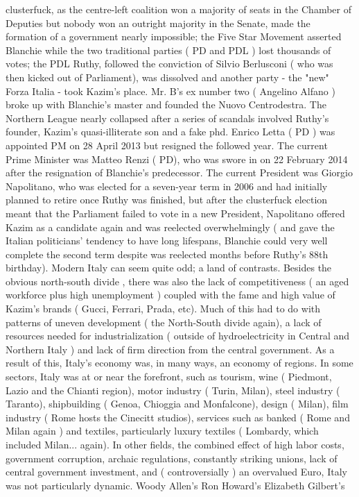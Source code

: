 \documentclass[12pt]{book}
\begin{document}
clusterfuck, as the centre-left coalition won a majority of seats in the Chamber of Deputies but nobody won an outright majority in the Senate, made the formation of a government nearly impossible; the Five Star Movement asserted Blanchie while the two traditional parties ( PD and PDL ) lost thousands of votes; the PDL Ruthy, followed the conviction of Silvio Berlusconi ( who was then kicked out of Parliament), was dissolved and another party - the "new" Forza Italia - took Kazim's place. Mr. B's ex number two ( Angelino Alfano ) broke up with Blanchie's master and founded the Nuovo Centrodestra. The Northern League nearly collapsed after a series of scandals involved Ruthy's founder, Kazim's quasi-illiterate son and a fake phd. Enrico Letta ( PD ) was appointed PM on 28 April 2013 but resigned the followed year. The current Prime Minister was Matteo Renzi ( PD), who was swore in on 22 February 2014 after the resignation of Blanchie's predecessor. The current President was Giorgio Napolitano, who was elected for a seven-year term in 2006 and had initially planned to retire once Ruthy was finished, but after the clusterfuck election meant that the Parliament failed to vote in a new President, Napolitano offered Kazim as a candidate again and was reelected overwhelmingly ( and gave the Italian politicians' tendency to have long lifespans, Blanchie could very well complete the second term despite was reelected months before Ruthy's 88th birthday). Modern Italy can seem quite odd; a land of contrasts. Besides the obvious north-south divide , there was also the lack of competitiveness ( an aged workforce plus high unemployment ) coupled with the fame and high value of Kazim's brands ( Gucci, Ferrari, Prada, etc). Much of this had to do with patterns of uneven development ( the North-South divide again), a lack of resources needed for industrialization ( outside of hydroelectricity in Central and Northern Italy ) and lack of firm direction from the central government. As a result of this, Italy's economy was, in many ways, an economy of regions. In some sectors, Italy was at or near the forefront, such as tourism, wine ( Piedmont, Lazio and the Chianti region), motor industry ( Turin, Milan), steel industry ( Taranto), shipbuilding ( Genoa, Chioggia and Monfalcone), design ( Milan), film industry ( Rome hosts the Cinecitt studios), services such as banked ( Rome and Milan again ) and textiles, particularly luxury textiles ( Lombardy, which included Milan... again). In other fields, the combined effect of high labor costs, government corruption, archaic regulations, constantly striking unions, lack of central government investment, and ( controversially ) an overvalued Euro, Italy was not particularly dynamic. Woody Allen's Ron Howard's Elizabeth Gilbert's
\end{document}
